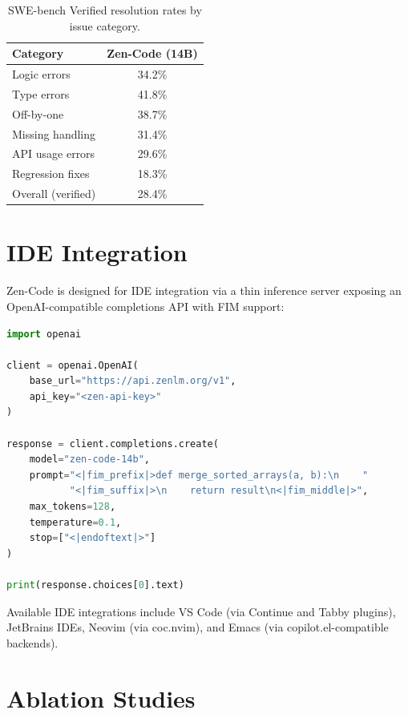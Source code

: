 \documentclass[11pt,a4paper]{article}
\begin{document}
\begin{table}[H]
\centering
\caption{SWE-bench Verified resolution rates by issue category.}
\label{tab:swebench}
\begin{tabular}{lc}
\toprule
\textbf{Category} & \textbf{Zen-Code (14B)} \\
\midrule
Logic errors        & 34.2\% \\
Type errors         & 41.8\% \\
Off-by-one          & 38.7\% \\
Missing handling    & 31.4\% \\
API usage errors    & 29.6\% \\
Regression fixes    & 18.3\% \\
\midrule
Overall (verified)  & 28.4\% \\
\bottomrule
\end{tabular}
\end{table}

\section{IDE Integration}

Zen-Code is designed for IDE integration via a thin inference server exposing an
OpenAI-compatible completions API with FIM support:

\begin{lstlisting}[language=Python, caption={Example FIM completion request.}]
import openai

client = openai.OpenAI(
    base_url="https://api.zenlm.org/v1",
    api_key="<zen-api-key>"
)

response = client.completions.create(
    model="zen-code-14b",
    prompt="<|fim_prefix|>def merge_sorted_arrays(a, b):\n    "
           "<|fim_suffix|>\n    return result\n<|fim_middle|>",
    max_tokens=128,
    temperature=0.1,
    stop=["<|endoftext|>"]
)

print(response.choices[0].text)
\end{lstlisting}

Available IDE integrations include VS Code (via Continue and Tabby plugins), JetBrains
IDEs, Neovim (via coc.nvim), and Emacs (via copilot.el-compatible backends).

\section{Ablation Studies}
\end{document}
